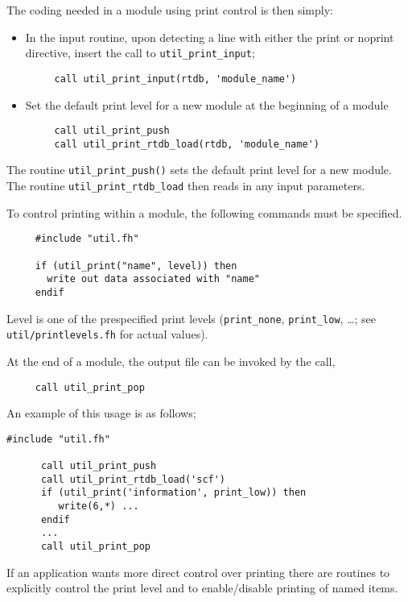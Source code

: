 \sloppy
The coding needed in a module using print control is then simply:
\begin{itemize}
\item In the input routine, upon detecting a line with either the print
  or noprint directive, insert the call to {\tt util\_print\_input};
\begin{verbatim}
     call util_print_input(rtdb, 'module_name')
\end{verbatim}
\item Set the default print level for a new module at the beginning of a module
\begin{verbatim}
     call util_print_push 
     call util_print_rtdb_load(rtdb, 'module_name')
\end{verbatim}
\end{itemize}

The routine \verb+util_print_push()+ sets the default print level for a new
  module. The routine \verb+util_print_rtdb_load+  then
 reads in any input parameters.

To control printing within a module, the following commands must be specified.

\begin{verbatim}
     #include "util.fh"

     if (util_print("name", level)) then
       write out data associated with "name"
     endif
\end{verbatim}


Level is one of the prespecified print levels (\verb+print_none+,
  \verb+print_low+, \ldots; see \verb+util/printlevels.fh+ for
  actual values).

At the end of a module, the output file can be invoked by the call,
\begin{verbatim}
     call util_print_pop
\end{verbatim}

\fussy

 An example of this usage is as follows;
\begin{verbatim}
#include "util.fh"

      call util_print_push
      call util_print_rtdb_load('scf')
      if (util_print('information', print_low)) then
         write(6,*) ...
      endif
      ...
      call util_print_pop
\end{verbatim}

 If an application wants more direct control over printing there are
routines to explicitly control the print level and to enable/disable
printing of named items.

